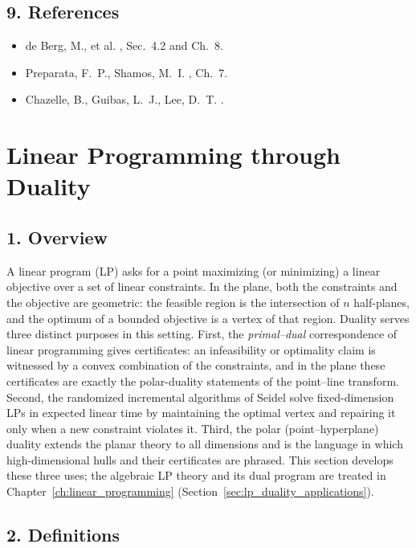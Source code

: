 \subsection{9. References}

\begin{itemize}
\item de Berg, M., et al. \cite{deberg2008}, Sec.~4.2 and Ch.~8.
\item Preparata, F.~P., Shamos, M.~I. \cite{preparata1985}, Ch.~7.
\item Chazelle, B., Guibas, L.~J., Lee, D.~T. \cite{chazelle1985power}.
\end{itemize}


\section{Linear Programming through Duality}
\label{sec:duality_linear_programming}

\subsection{1. Overview}

A linear program (LP) asks for a point maximizing (or minimizing) a linear
objective over a set of linear constraints. In the plane, both the
constraints and the objective are geometric: the feasible region is the
intersection of $n$ half-planes, and the optimum of a bounded objective is a
vertex of that region. Duality serves three distinct purposes in this
setting. First, the \emph{primal--dual} correspondence of linear programming
gives certificates: an infeasibility or optimality claim is witnessed by a
convex combination of the constraints, and in the plane these certificates
are exactly the polar-duality statements of the point--line transform.
Second, the randomized incremental algorithms of Seidel solve fixed-dimension
LPs in expected linear time by maintaining the optimal vertex and repairing
it only when a new constraint violates it. Third, the polar (point--hyperplane)
duality extends the planar theory to all dimensions and is the language in
which high-dimensional hulls and their certificates are phrased. This
section develops these three uses; the algebraic LP theory and its dual
program are treated in Chapter~\ref{ch:linear_programming}
(Section~\ref{sec:lp_duality_applications}).

\subsection{2. Definitions}

